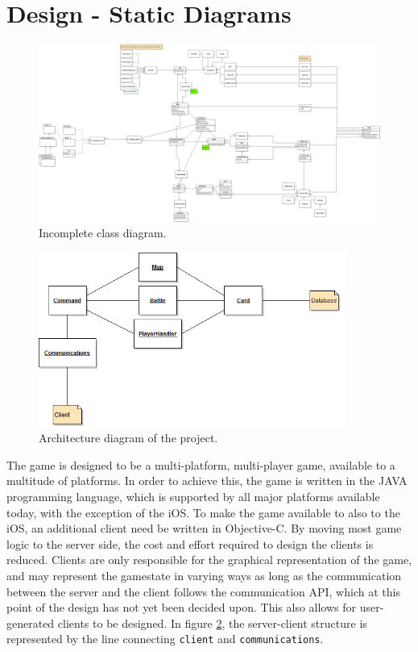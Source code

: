 
\section{Design - Static Diagrams}

\begin{figure}[]
\center
\includegraphics[width=1.65\textwidth,angle=90] {diagrams/ClassDiagram.png}
\caption{Incomplete class diagram.}
\label{classdiagram}
\end{figure}


\begin{figure}[]
\center
\includegraphics[width=0.9\textwidth] {diagrams/ArchitectureDiagram.png}
\caption{Architecture diagram of the project.}
\label{architecture}
\end{figure}


The game is designed to be a multi-platform, multi-player game, available to a multitude of platforms. In order to achieve this, the game is written in the JAVA programming language, which is supported by all major platforms available today, with the exception of the iOS. To make the game available to also to the iOS, an additional client need be written in Objective-C. By moving most game logic to the server side, the cost and effort required to design the clients is reduced. Clients are only responsible for the graphical representation of the game, and may represent the gamestate in varying ways as long as the communication between the server and the client follows the communication API, which at this point of the design has not yet been decided upon. This also allows for user-generated clients to be designed. In figure \ref{architecture}, the server-client structure is represented by the line connecting \texttt{client} and \texttt{communications}.

